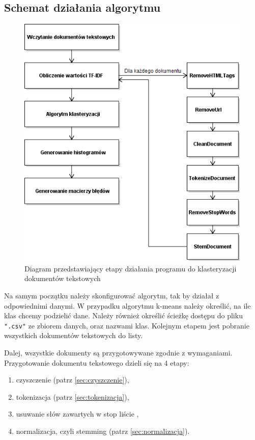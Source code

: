     \subsection{Schemat działania algorytmu} \label{sec:alg}
    \begin{figure}[h!]
        \centering
        \includegraphics[scale=0.6]{Rysunki/Rozdzial3/diagram.png}
        \caption{Diagram przedstawiający etapy działania programu do klasteryzacji dokumentów tekstowych}
        \label{fig:diagram}
    \end{figure}
    Na samym początku należy skonfigurować algorytm, tak by działał z odpowiednimi danymi. W przypadku algorytmu k-means należy określić, na ile klas chcemy podzielić dane. Należy również określić ścieżkę dostępu do pliku \texttt{".csv"} ze zbiorem danych, oraz nazwami klas. Kolejnym etapem jest pobranie wszystkich dokumentów tekstowych do listy.
    \newpage
    
    
    Dalej, wszystkie dokumenty są przygotowywane zgodnie z wymaganiami. Przygotowanie dokumentu tekstowego dzieli się na 4 etapy:
    \begin{enumerate}
        \item czyszczenie (patrz \ref{sec:czyszczenie}),
        \item tokenizacja (patrz \ref{sec:tokenizacja}),
        \item usuwanie słów zawartych w stop liście ,
        \item normalizacja, czyli stemming (patrz \ref{sec:normalizacja}).
    \end{enumerate}
    
